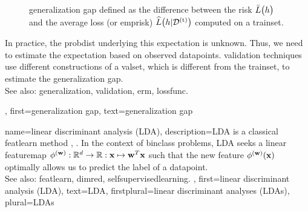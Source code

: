 {{\begin{figure}[H]
		\caption{\Gls{generalization} gap defined as the difference between the 
			\gls{risk} $\bar{L} \big( h \big)$ and the average \gls{loss} (or \gls{emprisk}) 
			$\widehat{L}\big(h|\mathcal{D}^{(\rm t)}\big)$ computed on a \gls{trainset}.}
		\end{figure}
	  	In practice, the \gls{probdist} underlying this \gls{expectation} is 
	  	unknown. Thus, we need to estimate the \gls{expectation} based on 
	  	observed \glspl{datapoint}. \Gls{validation} techniques 
	  	use different constructions of a \gls{valset}, which is different from 
	  	the \gls{trainset}, to estimate the \gls{generalization} gap.
		\\
		See also: \gls{generalization}, \gls{validation}, \gls{erm}, \gls{lossfunc}.}, 
	first={generalization gap}, 
	text={generalization gap}
}

{name={linear discriminant analysis (LDA)}, 
	description={LDA is a classical 
		\gls{featlearn} method \cite{BishopBook}, \cite{Fisher1936Taxonomic}. 
		In the context of \gls{binclass} problems, 
		LDA seeks a linear \gls{featuremap} $\phi^{({\bf w})}: \mathbb{R}^{d} 
		\rightarrow \mathbb{R}: {\bf x} \mapsto {\bf w}^{T} {\bf x}$ 
		such that the new \gls{feature} $\phi^{({\bf w})}({\bf x})$ 
		optimally allows us to predict the \gls{label} of a \gls{datapoint}. 
		\\
		See also: \gls{featlearn}, \gls{dimred}, \gls{selfsupervisedlearning}. }, 
 	first={linear discriminant analysis (LDA)},
 	text={LDA}, 
 	firstplural={linear discriminant analyses (LDAs)},
 	plural={LDAs}
}

